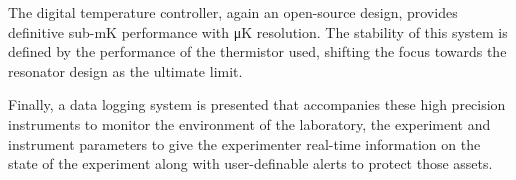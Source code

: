 {The digital temperature controller, again an open-source design, provides definitive sub-\unit{\milli\kelvin} performance with \unit{\micro\kelvin} resolution. The stability of this system is defined by the performance of the thermistor used, shifting the focus towards the resonator design as the ultimate limit.

Finally, a data logging system is presented that accompanies these high precision instruments to monitor the environment of the laboratory, the experiment and instrument parameters to give the experimenter real-time information on the state of the experiment along with user-definable alerts to protect those assets.
}
